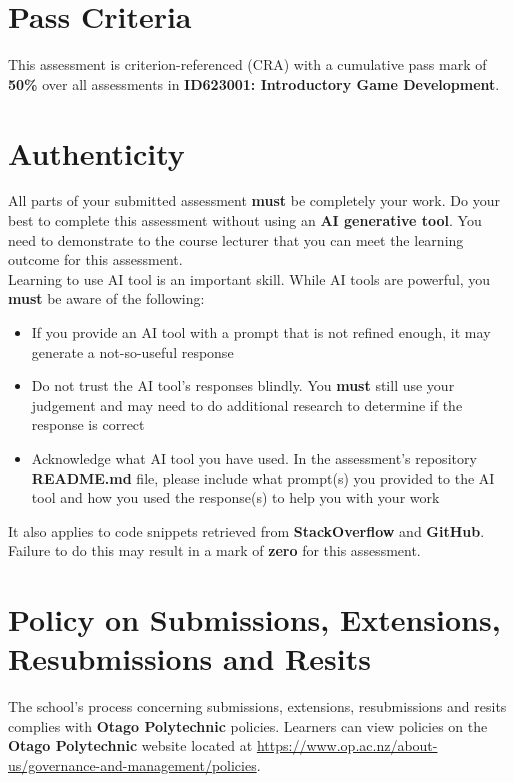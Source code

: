 \documentclass{article}
\begin{document}
\section*{Pass Criteria}
This assessment is criterion-referenced (CRA) with a cumulative pass mark of \textbf{50\%} over all assessments in \textbf{ID623001: Introductory Game Development}.

\section*{Authenticity}
All parts of your submitted assessment \textbf{must} be completely your work. Do your best to complete this assessment without using an \textbf{AI generative tool}. You need to demonstrate to the course lecturer that you can meet the learning outcome for this assessment. \\
 
Learning to use AI tool is an important skill. While AI tools are powerful, you \textbf{must} be aware of the following:

\begin{itemize}
    \item If you provide an AI tool with a prompt that is not refined enough, it may generate a not-so-useful response
    \item Do not trust the AI tool's responses blindly. You \textbf{must} still use your judgement and may need to do additional research to determine if the response is correct
    \item Acknowledge what AI tool you have used. In the assessment's repository \textbf{README.md} file, please include what prompt(s) you provided to the AI tool and how you used the response(s) to help you with your work
\end{itemize}

It also applies to code snippets retrieved from \textbf{StackOverflow} and \textbf{GitHub}. \\
 
Failure to do this may result in a mark of \textbf{zero} for this assessment.

\section*{Policy on Submissions, Extensions, Resubmissions and Resits}
The school's process concerning submissions, extensions, resubmissions and resits complies with \textbf{Otago Polytechnic} policies. Learners can view policies on the \textbf{Otago Polytechnic} website located at \href{https://www.op.ac.nz/about-us/governance-and-management/policies}{https://www.op.ac.nz/about-us/governance-and-management/policies}.
\end{document}
